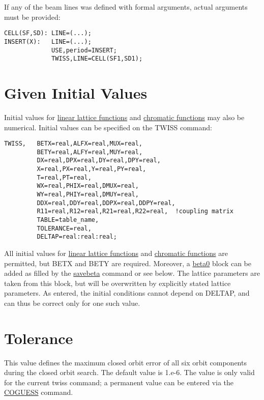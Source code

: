 If any of the beam lines was defined with formal arguments, actual arguments must be provided: 
\begin{verbatim}
CELL(SF,SD): LINE=(...);
INSERT(X):   LINE=(...);
             USE,period=INSERT;
             TWISS,LINE=CELL(SF1,SD1);
\end{verbatim}

\section{Given Initial Values}

Initial values for \href{../Introduction/tables.html#linear}{linear lattice functions} and \href{../Introduction/tables.html#chrom}{chromatic functions} may also be numerical. Initial values can be specified on the TWISS command: 
\begin{verbatim}
TWISS,   BETX=real,ALFX=real,MUX=real,
         BETY=real,ALFY=real,MUY=real,
         DX=real,DPX=real,DY=real,DPY=real,
         X=real,PX=real,Y=real,PY=real,
         T=real,PT=real,
         WX=real,PHIX=real,DMUX=real,
         WY=real,PHIY=real,DMUY=real,
         DDX=real,DDY=real,DDPX=real,DDPY=real,
         R11=real,R12=real,R21=real,R22=real,  !coupling matrix
         TABLE=table_name,
         TOLERANCE=real,
         DELTAP=real:real:real;
\end{verbatim}

All initial values for \href{../Introduction/tables.html#linear}{linear lattice functions} and \href{../Introduction/tables.html#chrom}{chromatic functions} are permitted, but BETX and BETY are required. Moreover, a \href{beta0}{beta0} block can be added as filled by the \href{../control/general.html#savebeta}{savebeta} command or see below. The lattice parameters are taken from this block, but will be overwritten by explicitly stated lattice parameters. As entered, the initial conditions cannot depend on DELTAP, and can thus be correct only for one such value. 

\section{Tolerance}

This value defines the maximum closed orbit error of all six orbit components during the closed orbit search. The default value is 1.e-6. The value is only valid for the current twiss command; a permanent value can be entered via the \href{../control/general.html#coguess}{COGUESS} command. 


